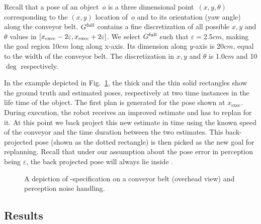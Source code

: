 \documentclass[a4paper]{report}
\begin{document}
%
Recall that a pose of an object~$o$ is a three dimensional point~$(x,y,\theta)$ corresponding to the $(x,y)$ location of~$o$ and to its orientation (yaw angle) along the conveyor belt.
%
$G^{\textrm{full}}$ contains a fine discretization of all possible $x,y$ and $\theta$ values in  $[x_{\textrm{exec}}-2\varepsilon, x_{\textrm{exec}}+2\varepsilon]$.
We select $G^{\textrm{full}}$ such that $\varepsilon = $2.5$cm$, making the goal region 10$cm$ long along x-axis. Its dimension along $y$-axis is 20$cm$, equal to the width of the conveyor belt. The discretization in $x,y$ and $\theta$ is 1.0$cm$ and 10$\deg$ respectively.

In the example depicted in Fig.~\ref{fig:pe}, the thick and the thin solid rectangles show the ground truth and estimated poses, respectively at two time instances in the life time of the object.
%
The first plan is generated for the pose shown at $x_{\textrm{exec}}$. During execution, the robot receives an improved estimate and has to replan for it. At this point we back project this new estimate in time using the known speed of the conveyor and the time duration between the two estimates. This back-projected pose (shown as the dotted rectangle) is then picked as the new goal for replanning. Recall that under our assumption about the pose error in perception being $\varepsilon$, the back projected pose will always lie inside \Gfull.
%



\begin{figure}
    \centering
    \caption{\CaptionTextSize A depiction of \Gfull-specification on a conveyor belt (overhead view) and perception noise handling. 
    }
    \label{fig:pe}
\end{figure}

\subsection{Results}
%
\end{document}
